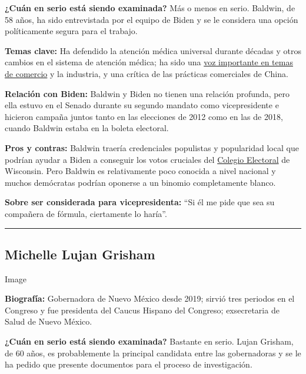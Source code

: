 \textbf{¿Cuán en serio está siendo examinada?} Más o menos en serio.
Baldwin, de 58 años, ha sido entrevistada por el equipo de Biden y se le
considera una opción políticamente segura para el trabajo.

\textbf{Temas clave:} Ha defendido la atención médica universal durante
décadas y otros cambios en el sistema de atención médica; ha sido una
\href{https://www.nytimes.com/2017/08/02/us/politics/senate-democrats-seek-to-outdo-trump-on-trade.html}{voz
importante en temas de comercio} y la industria, y una crítica de las
prácticas comerciales de China.

\textbf{Relación con Biden:} Baldwin y Biden no tienen una relación
profunda, pero ella estuvo en el Senado durante su segundo mandato como
vicepresidente e hicieron campaña juntos tanto en las elecciones de 2012
como en las de 2018, cuando Baldwin estaba en la boleta electoral.

\textbf{Pros y contras:} Baldwin traería credenciales populistas y
popularidad local que podrían ayudar a Biden a conseguir los votos
cruciales del
\href{https://www.nytimes.com/es/2016/11/08/espanol/claves-para-entender-el-colegio-electoral-y-seguir-la-eleccion-en-estados-unidos.html}{Colegio
Electoral} de Wisconsin. Pero Baldwin es relativamente poco conocida a
nivel nacional y muchos demócratas podrían oponerse a un binomio
completamente blanco.

\textbf{Sobre ser considerada para vicepresidenta:} ``Si él me pide que
sea su compañera de fórmula, ciertamente lo haría''.

\begin{center}\rule{0.5\linewidth}{\linethickness}\end{center}

\hypertarget{michelle-lujan-grisham}{%
\subsection{Michelle Lujan Grisham}\label{michelle-lujan-grisham}}

Image

\textbf{Biografía:} Gobernadora de Nuevo México desde 2019; sirvió tres
periodos en el Congreso y fue presidenta del Caucus Hispano del
Congreso; exsecretaria de Salud de Nuevo México.

\textbf{¿Cuán en serio está siendo examinada?} Bastante en serio. Lujan
Grisham, de 60 años, es probablemente la principal candidata entre las
gobernadoras y se le ha pedido que presente documentos para el proceso
de investigación.


